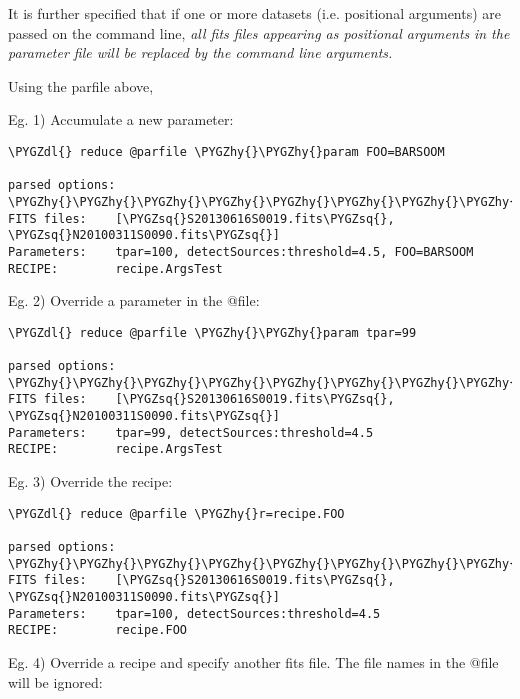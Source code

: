 \documentclass[letterpaper,10pt,english]{sphinxmanual}
\def\PYGZdl{\char`\$}
\def\PYGZhy{\char`\-}
\def\PYGZsq{\char`\'}
\begin{document}
It is further specified that if one or more datasets (i.e. positional arguments)
are passed on the command line, \emph{all fits files appearing as positional arguments}
\emph{in the parameter file will be replaced by the command line arguments.}

Using the parfile above,

Eg. 1)  Accumulate a new parameter:

\begin{Verbatim}[commandchars=\\\{\}]
\PYGZdl{} reduce @parfile \PYGZhy{}\PYGZhy{}param FOO=BARSOOM

parsed options:
\PYGZhy{}\PYGZhy{}\PYGZhy{}\PYGZhy{}\PYGZhy{}\PYGZhy{}\PYGZhy{}\PYGZhy{}\PYGZhy{}\PYGZhy{}\PYGZhy{}\PYGZhy{}\PYGZhy{}\PYGZhy{}\PYGZhy{}
FITS files:    [\PYGZsq{}S20130616S0019.fits\PYGZsq{}, \PYGZsq{}N20100311S0090.fits\PYGZsq{}]
Parameters:    tpar=100, detectSources:threshold=4.5, FOO=BARSOOM
RECIPE:        recipe.ArgsTest
\end{Verbatim}

Eg. 2) Override a parameter in the @file:

\begin{Verbatim}[commandchars=\\\{\}]
\PYGZdl{} reduce @parfile \PYGZhy{}\PYGZhy{}param tpar=99

parsed options:
\PYGZhy{}\PYGZhy{}\PYGZhy{}\PYGZhy{}\PYGZhy{}\PYGZhy{}\PYGZhy{}\PYGZhy{}\PYGZhy{}\PYGZhy{}\PYGZhy{}\PYGZhy{}\PYGZhy{}\PYGZhy{}\PYGZhy{}
FITS files:    [\PYGZsq{}S20130616S0019.fits\PYGZsq{}, \PYGZsq{}N20100311S0090.fits\PYGZsq{}]
Parameters:    tpar=99, detectSources:threshold=4.5
RECIPE:        recipe.ArgsTest
\end{Verbatim}

Eg. 3) Override the recipe:

\begin{Verbatim}[commandchars=\\\{\}]
\PYGZdl{} reduce @parfile \PYGZhy{}r=recipe.FOO

parsed options:
\PYGZhy{}\PYGZhy{}\PYGZhy{}\PYGZhy{}\PYGZhy{}\PYGZhy{}\PYGZhy{}\PYGZhy{}\PYGZhy{}\PYGZhy{}\PYGZhy{}\PYGZhy{}\PYGZhy{}\PYGZhy{}\PYGZhy{}
FITS files:    [\PYGZsq{}S20130616S0019.fits\PYGZsq{}, \PYGZsq{}N20100311S0090.fits\PYGZsq{}]
Parameters:    tpar=100, detectSources:threshold=4.5
RECIPE:        recipe.FOO
\end{Verbatim}

Eg. 4) Override a recipe and specify another fits file. The file names in
the @file will be ignored:
\end{document}
